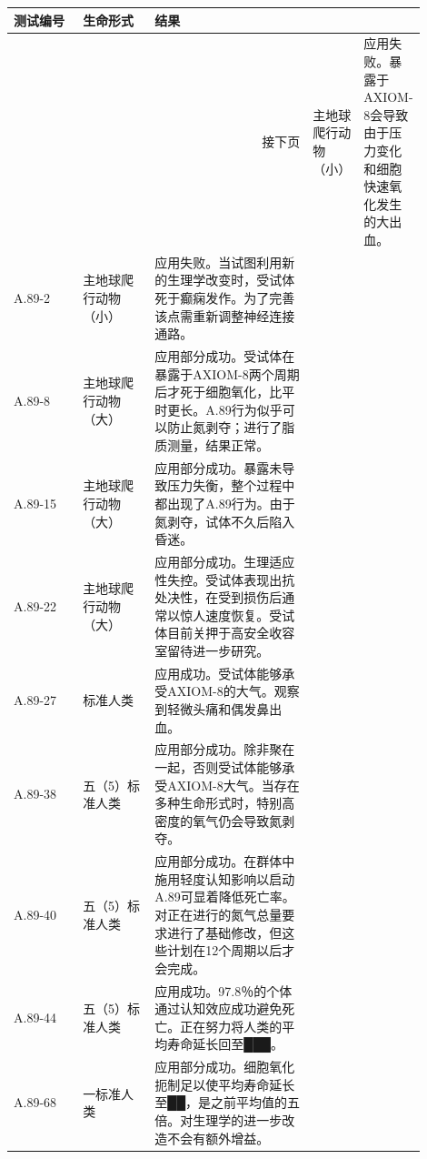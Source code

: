 \begin{scpbox}


\begin{longtable}{m{0.2\linewidth}m{0.2\linewidth}m{0.5\linewidth}}
\hline
测试编号 & 生命形式 & 结果\\
\hline
\endhead
\hline\multicolumn{3}{r}{\small{接下页}}
\endfoot
\hline
\endlastfoot
A.89-1 & 主地球爬行动物（小） & 应用失败。暴露于AXIOM-8会导致由于压力变化和细胞快速氧化发生的大出血。\\
A.89-2 & 主地球爬行动物（小） & 应用失败。当试图利用新的生理学改变时，受试体死于癫痫发作。为了完善该点需重新调整神经连接通路。\\
A.89-8 & 主地球爬行动物（大） & 应用部分成功。受试体在暴露于AXIOM-8两个周期后才死于细胞氧化，比平时更长。A.89行为似乎可以防止氮剥夺；进行了脂质测量，结果正常。\\
A.89-15 & 主地球爬行动物（大） & 应用部分成功。暴露未导致压力失衡，整个过程中都出现了A.89行为。由于氮剥夺，试体不久后陷入昏迷。\\
A.89-22 & 主地球爬行动物（大） & 应用部分成功。生理适应性失控。受试体表现出抗处决性，在受到损伤后通常以惊人速度恢复。受试体目前关押于高安全收容室留待进一步研究。\\
A.89-27 & 标准人类 & 应用成功。受试体能够承受AXIOM-8的大气。观察到轻微头痛和偶发鼻出血。\\
A.89-38 & 五（5）标准人类 & 应用部分成功。除非聚在一起，否则受试体能够承受AXIOM-8大气。当存在多种生命形式时，特别高密度的氧气仍会导致氮剥夺。\\
A.89-40 & 五（5）标准人类 & 应用部分成功。在群体中施用轻度认知影响以启动A.89可显着降低死亡率。对正在进行的氮气总量要求进行了基础修改，但这些计划在12个周期以后才会完成。\\
A.89-44 & 五（5）标准人类 & 应用成功。97.8％的个体通过认知效应成功避免死亡。正在努力将人类的平均寿命延长回至███。\\
A.89-68 & 一标准人类 & 应用部分成功。细胞氧化扼制足以使平均寿命延长至██，是之前平均值的五倍。对生理学的进一步改造不会有额外增益。
\end{longtable}






\end{scpbox}
